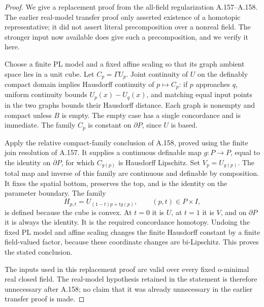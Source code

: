 \begin{proof}
We give a replacement proof from the all-field regularization
A.157--A.158. The earlier real-model transfer proof only asserted
existence of a homotopic representative; it did not assert literal
precomposition over a nonreal field. The stronger input now available
does give such a precomposition, and we verify it here.

Choose a finite PL model and a fixed affine scaling so that its graph
ambient space lies in a unit cube. Let \(C_p=\Gamma U_p\).
Joint continuity of \(U\) on the definably compact domain implies
Hausdorff continuity of \(p\mapsto C_p\): if \(p\) approaches \(q\),
uniform continuity bounds \(U_p(x)-U_q(x)\), and matching equal input
points in the two graphs bounds their Hausdorff distance. Each graph
is nonempty and compact unless \(B\) is empty. The empty case has a
single concordance and is immediate. The family \(C_p\) is constant
on \(\partial P\), since \(U\) is based.

Apply the relative compact-family conclusion of A.158, proved using
the finite join resolution of A.157. It supplies a continuous
definable map \(g:P\to P\), equal to the identity on \(\partial P\),
for which \(C_{g(p)}\) is Hausdorff Lipschitz. Set \(V_p=U_{g(p)}\).
The total map and inverse of this family are continuous and definable
by composition. It fixes the spatial bottom, preserves the top, and is
the identity on the parameter boundary. The family
\[
 H_{p,t}=U_{(1-t)p+t g(p)},\qquad (p,t)\in P\times I,
\]
is defined because the cube is convex. At \(t=0\) it is \(U\), at
\(t=1\) it is \(V\), and on \(\partial P\) it is always the identity.
It is the required concordance homotopy. Undoing the fixed PL model
and affine scaling changes the finite Hausdorff constant by a finite
field-valued factor, because these coordinate changes are bi-Lipschitz.
This proves the stated conclusion.

The inputs used in this replacement proof are valid over every fixed
o-minimal real closed field. The real-model hypothesis retained in the
statement is therefore unnecessary after A.158; no claim that it was
already unnecessary in the earlier transfer proof is made.
\end{proof}

